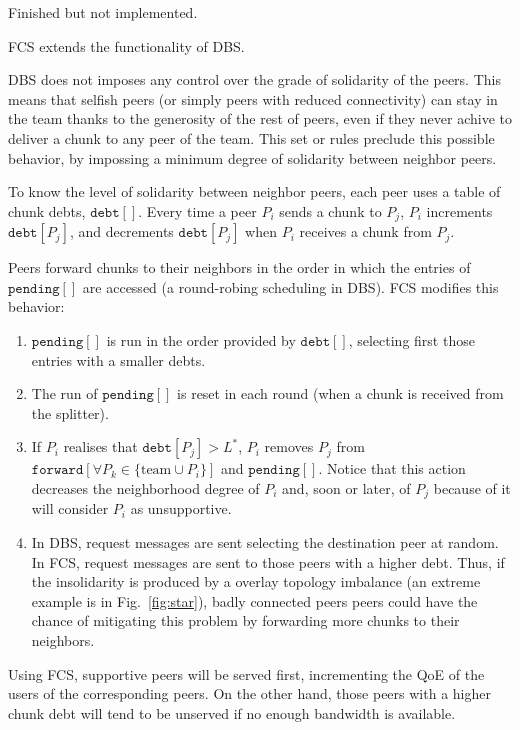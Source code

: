 

\begin{note}
  Finished but not implemented.
\end{note}

FCS extends the functionality of DBS.

DBS does not imposes any control over the grade of solidarity of the
peers. This means that selfish peers (or simply peers with reduced
connectivity) can stay in the team thanks to the generosity of the
rest of peers, even if they never achive to deliver a chunk to any
peer of the team. This set or rules preclude this possible behavior,
by impossing a minimum degree of solidarity between neighbor peers.

To know the level of solidarity between neighbor peers, each peer uses
a table of chunk debts, $\mathtt{debt}[]$. Every time a peer $P_i$
sends a chunk to $P_j$, $P_i$ increments $\mathtt{debt}[P_j]$, and
decrements $\mathtt{debt}[P_j]$ when $P_i$ receives a chunk from
$P_j$.

Peers forward chunks to their neighbors in the order in which the
entries of $\mathtt{pending}[]$ are accessed (a round-robing
scheduling in DBS). FCS modifies this behavior:
\begin{enumerate}
\item $\mathtt{pending}[]$ is run in the order provided by
  $\mathtt{debt}[]$, selecting first those entries with a smaller
  debts.
\item The run of $\mathtt{pending}[]$ is reset in each round (when a
  chunk is received from the splitter).
\item If $P_i$ realises that $\mathtt{debt}[P_j]>L^*$, $P_i$ removes
  $P_j$ from $\mathtt{forward}[\forall P_k\in\{\text{team}\cup P_i\}]$
  and $\mathtt{pending}[]$. Notice that this action decreases the
  neighborhood degree of $P_i$ and, soon or later, of $P_j$ because of
  it will consider $P_i$ as unsupportive.
\item In DBS, request messages are sent selecting the destination peer
  at random. In FCS, request messages are sent to those peers with a
  higher debt. Thus, if the insolidarity is produced by a overlay
  topology imbalance (an extreme example is in Fig.~\ref{fig:star}),
  badly connected peers peers could have the chance of mitigating this
  problem by forwarding more chunks to their neighbors.
\end{enumerate}

Using FCS, supportive peers will be served first, incrementing the QoE
of the users of the corresponding peers. On the other hand, those
peers with a higher chunk debt will tend to be unserved if no enough
bandwidth is available.

